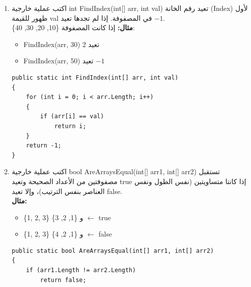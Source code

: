 \documentclass[14pt]{extarticle}
\begin{document}
\begin{enumerate}[resume, itemsep=2em]
    \item
    اكتب عملية خارجية \textenglish{int FindIndex(int[] arr, int val)} تعيد رقم الخانة (Index) لأول ظهور للقيمة \textenglish{val} في المصفوفة. إذا لم تجدها تعيد $-1$.\\
    \textbf{مثال:} إذا كانت المصفوفة \textenglish{\{10, 20, 30, 40\}}:
    \begin{itemize}
        \item \textenglish{FindIndex(arr, 30)} تعيد 2
        \item \textenglish{FindIndex(arr, 50)} تعيد $-1$
    \end{itemize}
    \ifwithsols
    \begin{boxSolution}
    \begin{english}
    \begin{verbatim}
public static int FindIndex(int[] arr, int val)
{
    for (int i = 0; i < arr.Length; i++)
    {
        if (arr[i] == val)
            return i;
    }
    return -1;
}
    \end{verbatim}
    \end{english}
    \end{boxSolution}
    \fi

    \item
    اكتب عملية خارجية \textenglish{bool AreArraysEqual(int[] arr1, int[] arr2)} تستقبل مصفوفتين من الأعداد الصحيحة وتعيد \textenglish{true} إذا كانتا متساويتين (نفس الطول ونفس العناصر بنفس الترتيب)، وإلا تعيد \textenglish{false}.\\
    \textbf{مثال:}
    \begin{itemize}
        \item \textenglish{\{1, 2, 3\}} و \textenglish{\{1, 2, 3\}} $\leftarrow$ \textenglish{true}
        \item \textenglish{\{1, 2, 3\}} و \textenglish{\{1, 2, 4\}} $\leftarrow$ \textenglish{false}
    \end{itemize}
    \ifwithsols
    \begin{boxSolution}
    \begin{english}
    \begin{verbatim}
public static bool AreArraysEqual(int[] arr1, int[] arr2)
{
    if (arr1.Length != arr2.Length)
        return false;


\end{verbatim}
\end{english}
\end{boxSolution}
\end{enumerate}
\end{document}
